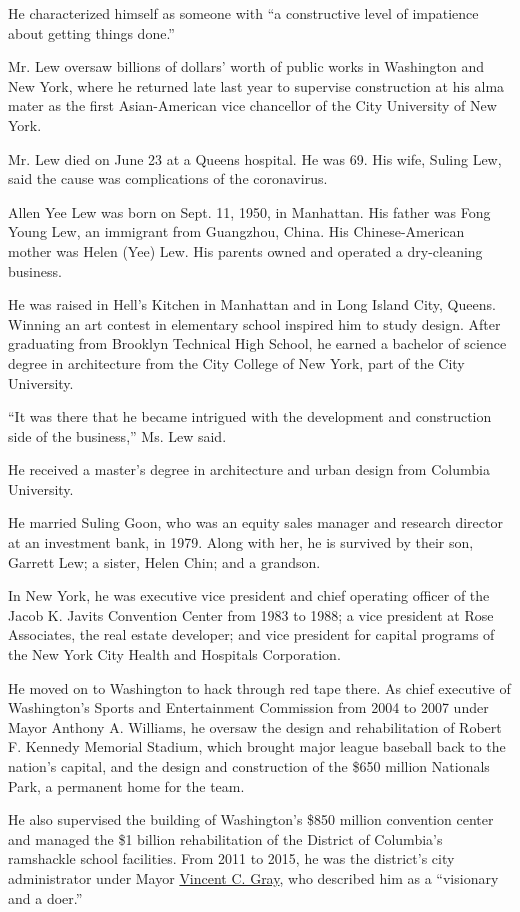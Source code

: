 He characterized himself as someone with ``a constructive level of
impatience about getting things done.''

Mr. Lew oversaw billions of dollars' worth of public works in Washington
and New York, where he returned late last year to supervise construction
at his alma mater as the first Asian-American vice chancellor of the
City University of New York.

Mr. Lew died on June 23 at a Queens hospital. He was 69. His wife,
Suling Lew, said the cause was complications of the coronavirus.

Allen Yee Lew was born on Sept. 11, 1950, in Manhattan. His father was
Fong Young Lew, an immigrant from Guangzhou, China. His Chinese-American
mother was Helen (Yee) Lew. His parents owned and operated a
dry-cleaning business.

He was raised in Hell's Kitchen in Manhattan and in Long Island City,
Queens. Winning an art contest in elementary school inspired him to
study design. After graduating from Brooklyn Technical High School, he
earned a bachelor of science degree in architecture from the City
College of New York, part of the City University.

``It was there that he became intrigued with the development and
construction side of the business,'' Ms. Lew said.

He received a master's degree in architecture and urban design from
Columbia University.

He married Suling Goon, who was an equity sales manager and research
director at an investment bank, in 1979. Along with her, he is survived
by their son, Garrett Lew; a sister, Helen Chin; and a grandson.

In New York, he was executive vice president and chief operating officer
of the Jacob K. Javits Convention Center from 1983 to 1988; a vice
president at Rose Associates, the real estate developer; and vice
president for capital programs of the New York City Health and Hospitals
Corporation.

He moved on to Washington to hack through red tape there. As chief
executive of Washington's Sports and Entertainment Commission from 2004
to 2007 under Mayor Anthony A. Williams, he oversaw the design and
rehabilitation of Robert F. Kennedy Memorial Stadium, which brought
major league baseball back to the nation's capital, and the design and
construction of the \$650 million Nationals Park, a permanent home for
the team.

He also supervised the building of Washington's \$850 million convention
center and managed the \$1 billion rehabilitation of the District of
Columbia's ramshackle school facilities. From 2011 to 2015, he was the
district's city administrator under Mayor
\href{https://www.nytimes3xbfgragh.onion/2014/04/02/us/muriel-bowser-defeats-mayor-vincent-gray-in-washington-primary.html}{Vincent
C. Gray}, who described him as a ``visionary and a doer.''

